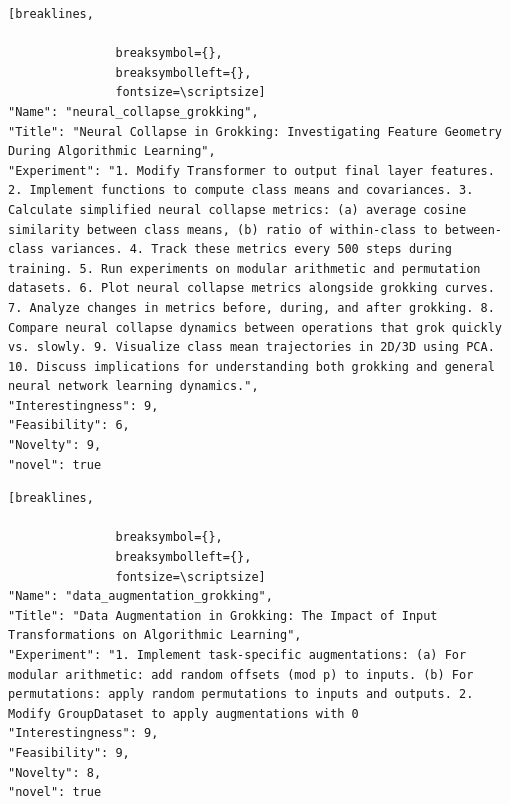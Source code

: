 \begin{tcolorbox}[
  breakable,
  colback  = blue!5!white,
  colframe = blue!75!black,
  title    = {Idea 27/50 - \texttt{neural\_collapse\_grokking}},
  fontupper=\scriptsize\ttfamily,
]
\begin{Verbatim}[breaklines,

               breaksymbol={},
               breaksymbolleft={},
               fontsize=\scriptsize]
"Name": "neural_collapse_grokking",
"Title": "Neural Collapse in Grokking: Investigating Feature Geometry During Algorithmic Learning",
"Experiment": "1. Modify Transformer to output final layer features. 2. Implement functions to compute class means and covariances. 3. Calculate simplified neural collapse metrics: (a) average cosine similarity between class means, (b) ratio of within-class to between-class variances. 4. Track these metrics every 500 steps during training. 5. Run experiments on modular arithmetic and permutation datasets. 6. Plot neural collapse metrics alongside grokking curves. 7. Analyze changes in metrics before, during, and after grokking. 8. Compare neural collapse dynamics between operations that grok quickly vs. slowly. 9. Visualize class mean trajectories in 2D/3D using PCA. 10. Discuss implications for understanding both grokking and general neural network learning dynamics.",
"Interestingness": 9,
"Feasibility": 6,
"Novelty": 9,
"novel": true
\end{Verbatim}
\end{tcolorbox}

\begin{tcolorbox}[
  breakable,
  colback  = blue!5!white,
  colframe = blue!75!black,
  title    = {Idea 28/50 - \texttt{data\_augmentation\_grokking}},
  fontupper=\scriptsize\ttfamily,
]
\begin{Verbatim}[breaklines,

               breaksymbol={},
               breaksymbolleft={},
               fontsize=\scriptsize]
"Name": "data_augmentation_grokking",
"Title": "Data Augmentation in Grokking: The Impact of Input Transformations on Algorithmic Learning",
"Experiment": "1. Implement task-specific augmentations: (a) For modular arithmetic: add random offsets (mod p) to inputs. (b) For permutations: apply random permutations to inputs and outputs. 2. Modify GroupDataset to apply augmentations with 0
"Interestingness": 9,
"Feasibility": 9,
"Novelty": 8,
"novel": true
\end{Verbatim}
\end{tcolorbox}

